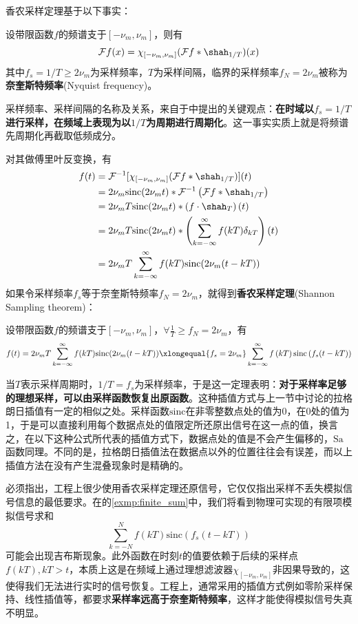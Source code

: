 香农采样定理基于以下事实：
\begin{theorem}[采样定理]
    设带限函数$f$的频谱支于$[-\nu_m,\nu_m]$，则有
    \[\mathcal{F} f(x)=\chi_{[-\nu_m,\nu_m]}(\mathcal{F} f*\shah_{1/T})(x)\]
    其中$f_s=1/T\geq 2\nu_m$为采样频率，$T$为采样间隔，临界的采样频率$f_N=2\nu_m$被称为\textbf{奈奎斯特频率}(Nyquist frequency)。
\end{theorem}

采样频率、采样间隔的名称及关系，来自于中提出的关键观点：\textbf{在时域以$f_s=1/T$进行采样，在频域上表现为以$1/T$为周期进行周期化}。这一事实实质上就是将频谱先周期化再截取低频成分。

对其做傅里叶反变换，有\begin{align*}
    f(t)&=\mathcal{F} ^{-1} [\chi_{[-\nu_m,\nu_m]}(\mathcal{F} f*\shah_{1/T})](t)\\
    &=2\nu_m\mathrm{sinc}(2\nu_m t)*\mathcal{F} ^{-1} \left(\mathcal{F} f*\shah_{1/T}\right)\\
    &=2\nu_m T\mathrm{sinc}(2\nu_m t)*\left(f\cdot\shah_T\right)(t)\\
    &=2\nu_m T\mathrm{sinc}(2\nu_m t)*\left(\sum_{k=-\infty}^{\infty}f(kT)\delta_{kT}\right)(t)\\
    &=2\nu_m T\sum_{k=-\infty}^{\infty}f(kT)\mathrm{sinc}(2\nu_m (t-kT))
\end{align*}
如果令采样频率$f_s$等于奈奎斯特频率$f_N=2\nu_m$，就得到\textbf{香农采样定理}(Shannon Sampling theorem)：
\begin{theorem}[香农采样定理]
    设带限函数$f$的频谱支于$[-\nu_m,\nu_m]$，$\forall \frac{1}{T}\geq f_N=2\nu_m$，有
    \begin{align*}
        f(t)=2\nu_m T\sum_{k=-\infty}^{\infty}f(kT)\mathrm{sinc}(2\nu_m (t-kT))\xlongequal{f_s=2\nu_m} \sum_{k=-\infty}^{\infty}f\left(kT\right)\mathrm{sinc}\left(f_s(t-kT)\right)
    \end{align*}
\end{theorem}
当$T$表示采样周期时，$1/T=f_s$为采样频率，于是这一定理表明：\textbf{对于采样率足够的理想采样，可以由采样函数恢复出原函数}。这种插值方式与上一节中讨论的拉格朗日插值有一定的相似之处。采样函数$\mathrm{sinc}$在非零整数点处的值为0，在0处的值为1，于是可以直接利用每个数据点处的值限定所还原出信号在这一点的值，换言之，在以下这种公式所代表的插值方式下，数据点处的值是不会产生偏移的，$\mathrm{Sa}$函数同理。不同的是，拉格朗日插值法在数据点以外的位置往往会有误差，而以上插值方法在没有产生混叠现象时是精确的。

必须指出，工程上很少使用香农采样定理还原信号，它仅仅指出采样不丢失模拟信号信息的最低要求。在的\cref{exmp:finite_sum}中，我们将看到物理可实现的有限项模拟信号求和
$$\sum_{k=-N}^{N}f\left(kT\right)\mathrm{sinc}\left(f_s(t-kT)\right)$$
可能会出现吉布斯现象。此外函数在时刻$t$的值要依赖于后续的采样点$f(kT),kT>t$，本质上这是在频域上通过理想滤波器$\chi_{[-\nu_m,\nu_m]}$非因果导致的，这使得我们无法进行实时的信号恢复。工程上，通常采用的插值方式例如零阶采样保持、线性插值等，都要求\textbf{采样率远高于奈奎斯特频率}，这样才能使得模拟信号失真不明显。


